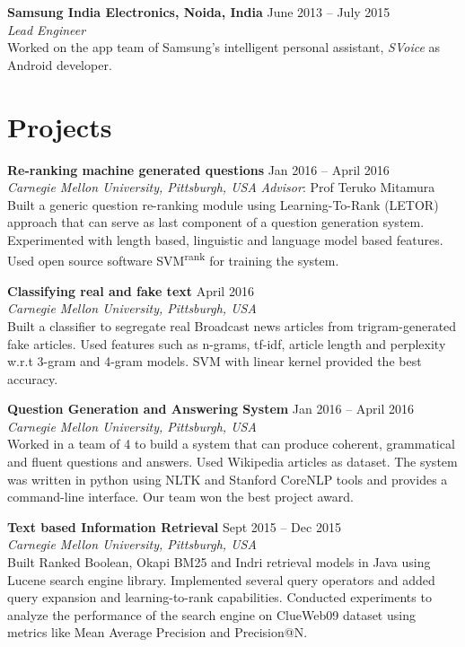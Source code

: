 \documentclass[margin,line]{resume}
\begin{document}
\begin{resume}
		\textbf{Samsung India Electronics, Noida, India} \hfill June 2013 -- July 2015\\
		\textit{Lead Engineer}\\
		Worked on the app team of Samsung's intelligent personal assistant, \textit{SVoice} as Android developer.
		 
\section{\mysidestyle Projects}
        \textbf{Re-ranking machine generated questions} \hfill Jan 2016 -- April 2016\\
  		\textit{Carnegie Mellon University, Pittsburgh, USA} \hfill \textit{Advisor}: Prof Teruko Mitamura\\
	     Built a generic question re-ranking module using Learning-To-Rank (LETOR) approach that can serve as last component of a question generation system. Experimented with length based, linguistic and language model based features. Used open source software SVM\textsuperscript{rank} for training the system. 
        
        \textbf{Classifying real and fake text} 
        \hfill April 2016\\
  		\textit{Carnegie Mellon University, Pittsburgh, USA}\\
	    Built a classifier to segregate real Broadcast news articles from trigram-generated fake articles. Used features such as n-grams, tf-idf, article length and  perplexity w.r.t 3-gram and 4-gram models. SVM with linear kernel provided the best accuracy. 
        
        \textbf{Question Generation and Answering System} \hfill Jan 2016 -- April 2016 \\
  		\textit{Carnegie Mellon University, Pittsburgh, USA}\\
	     Worked in a team of 4 to build a system that can produce coherent, grammatical and fluent questions and answers. Used Wikipedia articles as dataset. The system was written in python using NLTK and Stanford CoreNLP tools and provides a command-line interface. Our team won the best project award. 

		\textbf{Text based Information Retrieval} \hfill Sept 2015 -- Dec 2015 \\
  		\textit{Carnegie Mellon University, Pittsburgh, USA}\\
	     Built Ranked Boolean, Okapi BM25 and Indri retrieval models in Java using Lucene search engine library. Implemented several query operators and added query expansion and learning-to-rank capabilities. Conducted experiments to analyze the performance of the search engine on ClueWeb09 dataset using metrics like Mean Average Precision and Precision@N.


\end{resume}
\end{document}
